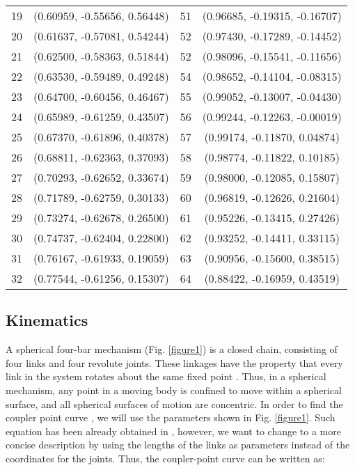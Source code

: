 \documentclass[11pt]{article}
\begin{document}
\begin{table}[ht]
{\begin{tabular}{c c c c }
             19 & (0.60959, -0.55656, 0.56448) & 51 & (0.96685, -0.19315, -0.16707) \\
             20 & (0.61637, -0.57081, 0.54244) & 52 & (0.97430, -0.17289, -0.14452) \\
             21 & (0.62500, -0.58363, 0.51844) & 52 & (0.98096, -0.15541, -0.11656) \\
             22 & (0.63530, -0.59489, 0.49248) & 54 & (0.98652, -0.14104, -0.08315) \\
             23 & (0.64700, -0.60456, 0.46467) & 55 & (0.99052, -0.13007, -0.04430) \\
             24 & (0.65989, -0.61259, 0.43507) & 56 & (0.99244, -0.12263, -0.00019) \\
             25 & (0.67370, -0.61896, 0.40378) & 57 & (0.99174, -0.11870, 0.04874) \\
             26 & (0.68811, -0.62363, 0.37093) & 58 & (0.98774, -0.11822, 0.10185) \\
             27 & (0.70293, -0.62652, 0.33674) & 59 & (0.98000, -0.12085, 0.15807) \\
             28 & (0.71789, -0.62759, 0.30133) & 60 & (0.96819, -0.12626, 0.21604) \\
             29 & (0.73274, -0.62678, 0.26500) & 61 & (0.95226, -0.13415, 0.27426) \\
             30 & (0.74737, -0.62404, 0.22800) & 62 & (0.93252, -0.14411, 0.33115) \\
             31 & (0.76167, -0.61933, 0.19059) & 63 & (0.90956, -0.15600, 0.38515) \\
             32 & (0.77544, -0.61256, 0.15307) & 64 & (0.88422, -0.16959, 0.43519) \\
\bottomrule
\end{tabular} }
\label{table64p}
\end{table}

\subsection{Kinematics}
A spherical four-bar mechanism (Fig. \ref{figure1}) is a closed chain, 
consisting of four links and four revolute joints. These linkages have 
the property that every link in the system rotates about the same fixed 
point \cite{McCarthy2000}. Thus, in a spherical mechanism, any point in 
a moving body is confined to move within a spherical surface, and all 
spherical surfaces of motion are concentric. In order to find the 
coupler point curve , we will use the 
parameters shown in Fig.  \ref{figure1}. Such equation has been already 
obtained in \cite{Penunuri2012}, however, we want to change to a more 
concise description by using the lengths of the links as parameters 
instead of the coordinates for the joints. Thus, the coupler-point curve 
can be written as: 
\end{document}
